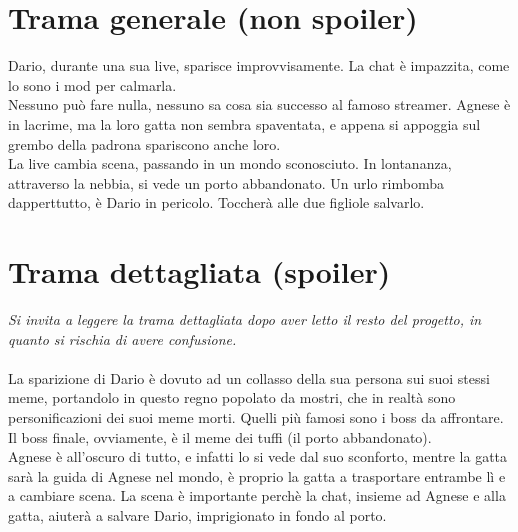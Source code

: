 \section{Trama generale (non spoiler)}
    Dario, durante una sua live, sparisce improvvisamente. La chat è impazzita, come lo sono i mod per calmarla.\\
    Nessuno può fare nulla, nessuno sa cosa sia successo al famoso streamer. Agnese è in lacrime, ma la loro gatta
    non sembra spaventata, e appena si appoggia sul grembo della padrona spariscono anche loro.\\
    La live cambia scena, passando in un mondo sconosciuto. In lontananza, attraverso la nebbia, si vede un porto abbandonato.
    Un urlo rimbomba dapperttutto, è Dario in pericolo. Toccherà alle due figliole salvarlo.

\section{Trama dettagliata (spoiler)}
    \emph{Si invita a leggere la trama dettagliata dopo aver letto il resto del progetto, in quanto si rischia di avere confusione.}\\\\
    La sparizione di Dario è dovuto ad un collasso della sua persona sui suoi stessi meme, portandolo in questo regno popolato
    da mostri, che in realtà sono personificazioni dei suoi meme morti. Quelli più famosi sono i boss da affrontare. Il boss finale,
    ovviamente, è il meme dei tuffi (il porto abbandonato).\\
    Agnese è all'oscuro di tutto, e infatti lo si vede dal suo sconforto, mentre la gatta sarà
    la guida di Agnese nel mondo, è proprio la gatta a trasportare entrambe lì e a cambiare scena. La scena è importante perchè
    la chat, insieme ad Agnese e alla gatta, aiuterà a salvare Dario, imprigionato in fondo al porto.\\
    
